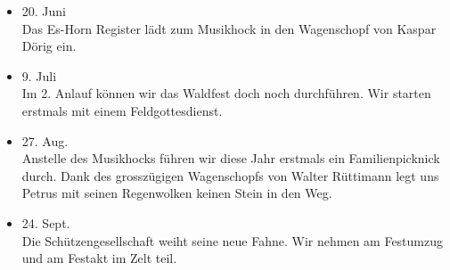 \begin{history}
\begin{itemize}
        \item 20. Juni\\
              Das Es-Horn Register lädt zum Musikhock in den Wagenschopf von Kaspar
              Dörig ein.

        \item 9. Juli\\
              Im 2. Anlauf können wir das Waldfest doch noch durchführen. Wir starten
              erstmals mit einem Feldgottesdienst.

        \item 27. Aug.\\
              Anstelle des Musikhocks führen wir diese Jahr erstmals ein
              Familienpicknick durch. Dank des grosszügigen Wagenschopfs von Walter
              Rüttimann legt uns Petrus mit seinen Regenwolken keinen Stein in den
              Weg.

        \item 24. Sept.\\
              Die Schützengesellschaft weiht seine neue Fahne. Wir nehmen am Festumzug
              und am Festakt im Zelt teil.

    \end{itemize}

\end{history}

